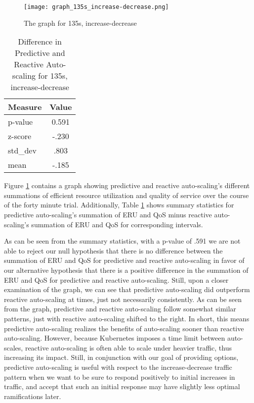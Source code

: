 \begin{figure}[!h]
  \centerline{\texttt{[image: graph\_135s\_increase-decrease.png]}}
  \caption{The graph for 135s, increase-decrease}
  \label{fig:135s-increase-decrease}
\end{figure}

\begin{table}[htbp]
  \centering
  \caption{Difference in Predictive and Reactive Auto-scaling for 135s, increase-decrease}
  \label{tab:135s-increase-decrease}
\begin{tabular}{l c}\hline\hline
    \multicolumn{1}{c}{\textbf{Measure}} & \textbf{Value} \\ \hline
     p-value & 0.591 \\
     z-score & -.230 \\
     std\_dev & .803 \\
     mean & -.185
  \end{tabular}
\end{table}

Figure \ref{fig:135s-increase-decrease} contains a graph
showing predictive and reactive auto-scaling's different
summations of efficient resource utilization and quality of service over the
course of the forty minute trial. Additionally, Table
\ref{tab:135s-increase-decrease} shows summary statistics for predictive
auto-scaling's summation of ERU and QoS minus reactive auto-scaling's summation
of ERU and QoS for corresponding intervals.

As can be seen from the summary statistics, with a p-value of .591 we are not
able to reject our null hypothesis that there is no difference between the
summation of ERU and QoS for predictive and reactive auto-scaling in favor of
our alternative hypothesis that there is a positive difference in the summation
of ERU and QoS for predictive and reactive auto-scaling. Still, upon a closer
examination of the graph, we can see that predictive auto-scaling did outperform
reactive auto-scaling at times, just not necessarily consistently. As can be
seen from the graph, predictive and reactive auto-scaling follow somewhat
similar patterns, just with reactive auto-scaling shifted to the right. In
short, this means predictive auto-scaling realizes the benefits of auto-scaling
sooner than reactive auto-scaling. However, because Kubernetes imposes a time
limit between auto-scales, reactive auto-scaling is often able to scale under
heavier traffic, thus increasing its impact. Still, in conjunction with our goal
of providing options, predictive auto-scaling is useful with respect to
the increase-decrease traffic pattern when we want to be sure to respond
positively to initial increases in traffic, and accept that such an initial
response may have slightly less optimal ramifications later.
